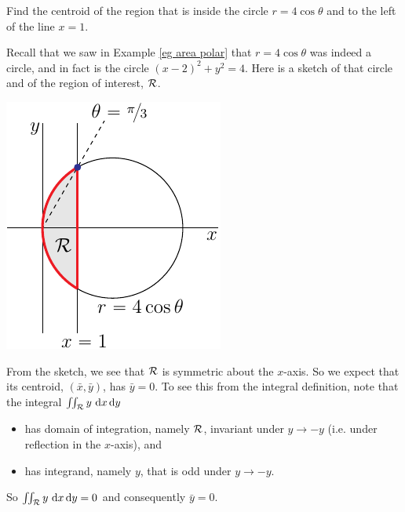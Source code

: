 \begin{eg}\label{eg cofm polar}
Find the centroid of the region that is inside the circle
$r=4\cos\theta$ and to the left of the line $x=1$.

\soln
Recall that we saw in Example \ref{eg area polar}
that $r=4\cos\theta$ was indeed a circle, and in fact is the 
circle $(x-2)^2+y^2=4$.
Here is a sketch of that circle and of the region of interest, $\mathcal{R}$.

\begin{efig}
\begin{center}
    \includegraphics{comPolarA.pdf}
\end{center}
\end{efig}\noindent
From the sketch, we see that $\mathcal{R}$
is symmetric about  the $x$-axis. So we expect that its centroid, 
$(\bar x,\bar y)$, has $\bar y=0$. To see this from the integral definition,
note that the integral $\iint_{\mathcal{R}} y\  \mathrm{d}x\,\mathrm{d}y$
\begin{itemize}\itemsep1pt \parskip0pt 
\item 
has domain of integration, namely $\mathcal{R}$,  invariant 
under $y\rightarrow -y$ (i.e. under reflection in the $x$-axis), and
\item 
has integrand, namely $y$, that is odd under $y\rightarrow -y$.
\end{itemize}
So $\iint_{\mathcal{R}} y\  \mathrm{d}x\,\mathrm{d}y=0$ and consequently $\bar y=0$.


\end{eg}
